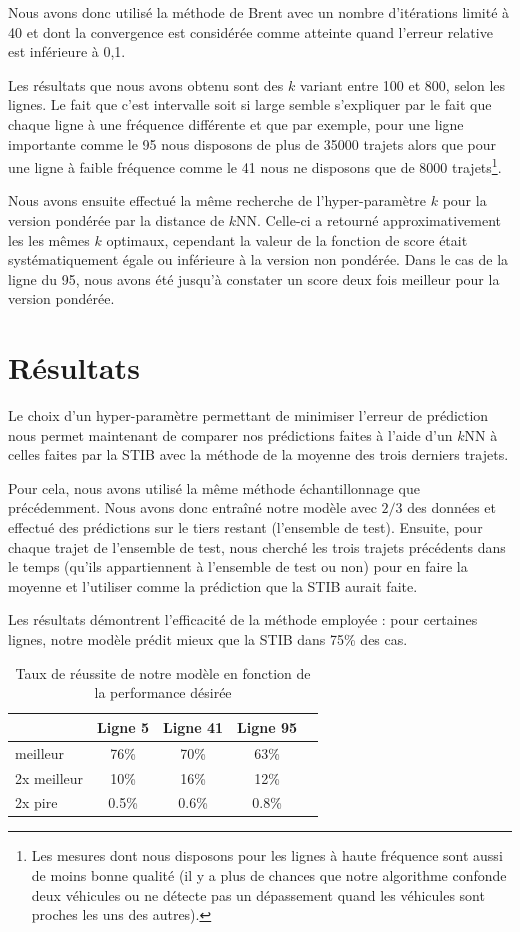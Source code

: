\documentclass[letterpaper]{article}
\begin{document}
Nous avons donc utilisé la méthode de Brent avec un nombre d'itérations limité à 40 et dont la convergence est considérée comme atteinte quand l'erreur relative est inférieure à 0,1.

Les résultats que nous avons obtenu sont des $k$ variant entre 100 et 800, selon les lignes. Le fait que c'est intervalle soit si large semble s'expliquer par le fait que chaque ligne à une fréquence différente et que par exemple, pour une ligne importante comme le 95 nous disposons de plus de 35000 trajets alors que pour une ligne à faible fréquence comme le 41 nous ne disposons que de 8000 trajets\footnote{Les mesures dont nous disposons pour les lignes à haute fréquence sont aussi de moins bonne qualité (il y a plus de chances que notre algorithme confonde deux véhicules ou ne détecte pas un dépassement quand les véhicules sont proches les uns des autres).}.

Nous avons ensuite effectué la même recherche de l'hyper-paramètre $k$ pour la version pondérée par la distance de $k$NN. Celle-ci a retourné approximativement les les mêmes $k$ optimaux, cependant la valeur de la fonction de score était systématiquement égale ou inférieure à la version non pondérée. Dans le cas de la ligne du 95, nous avons été jusqu'à constater un score deux fois meilleur pour la version pondérée.

\section{Résultats}

Le choix d'un hyper-paramètre permettant de minimiser l'erreur de prédiction nous permet maintenant de comparer nos prédictions faites à l'aide d'un $k$NN à celles faites par la STIB avec la méthode de la moyenne des trois derniers trajets.

Pour cela, nous avons utilisé la même méthode échantillonnage que précédemment. Nous avons donc entraîné notre modèle avec $2/3$ des données et effectué des prédictions sur le tiers restant (l'ensemble de test). Ensuite, pour chaque trajet de l'ensemble de test, nous cherché les trois trajets précédents dans le temps (qu'ils appartiennent à l'ensemble de test ou non) pour en faire la moyenne et l'utiliser comme la prédiction que la STIB aurait faite.

Les résultats démontrent l'efficacité de la méthode employée : pour certaines lignes, notre modèle prédit mieux que la STIB dans 75\% des cas.

\begin{table}[h]
\centering
\begin{tabular}{|l|c|c|c|c|}
  \hline
  & Ligne 5 & Ligne 41 & Ligne 95 \\
  \hline
  meilleur &  76\%  & 70\%  & 63\%  \\
  2x meilleur &  10\%  & 16\%  & 12\%  \\
  2x pire &  0.5\% & 0.6\% & 0.8\% \\
  \hline
\end{tabular}
  \caption{\label{tab:perf}Taux de réussite de notre modèle en fonction de la performance désirée}
\end{table}
\end{document}

